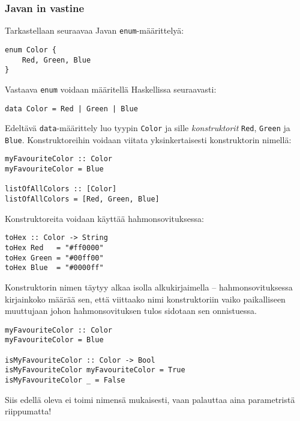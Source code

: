 \subsubsection{Javan in vastine}
Tarkastellaan seuraavaa Javan \texttt{enum}-määrittelyä:
\begin{verbatim}
enum Color {
    Red, Green, Blue
}
\end{verbatim}
Vastaava \texttt{enum} voidaan määritellä Haskellissa seuraavasti:
\begin{verbatim}
data Color = Red | Green | Blue
\end{verbatim}
Edeltävä \texttt{data}-määrittely luo tyypin \texttt{Color} ja sille \emph{konstruktorit} \texttt{Red}, \texttt{Green} ja \texttt{Blue}.
Konstruktoreihin voidaan viitata yksinkertaisesti konstruktorin nimellä:
\begin{verbatim}
myFavouriteColor :: Color
myFavouriteColor = Blue

listOfAllColors :: [Color]
listOfAllColors = [Red, Green, Blue]
\end{verbatim}

Konstruktoreita voidaan käyttää hahmonsovituksessa:
\begin{verbatim}
toHex :: Color -> String
toHex Red   = "#ff0000"
toHex Green = "#00ff00"
toHex Blue  = "#0000ff"
\end{verbatim}

Konstruktorin nimen täytyy alkaa isolla alkukirjaimella --
hahmonsovituksessa kirjainkoko määrää sen, että viittaako nimi konstruktoriin
vaiko paikalliseen muuttujaan johon hahmonsovituksen tulos sidotaan sen onnistuessa.

\begin{verbatim}
myFavouriteColor :: Color
myFavouriteColor = Blue

isMyFavouriteColor :: Color -> Bool
isMyFavouriteColor myFavouriteColor = True
isMyFavouriteColor _ = False
\end{verbatim}

Siis edellä oleva  ei toimi nimensä mukaisesti,
vaan palauttaa aina  parametristä riippumatta!

